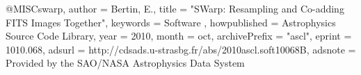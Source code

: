 
@MISC{swarp,
   author = {{Bertin}, E.},
    title = "{SWarp: Resampling and Co-adding FITS Images Together}",
 keywords = {Software },
howpublished = {Astrophysics Source Code Library},
     year = 2010,
    month = oct,
archivePrefix = "ascl",
   eprint = {1010.068},
   adsurl = {http://cdsads.u-strasbg.fr/abs/2010ascl.soft10068B},
  adsnote = {Provided by the SAO/NASA Astrophysics Data System}
}
